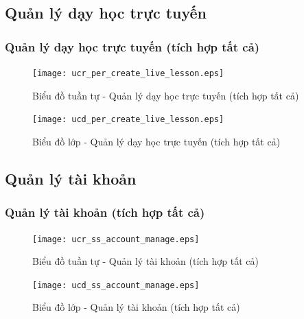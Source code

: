 \documentclass[./../main.tex]{subfiles}
\begin{document}
\subsection{Quản lý dạy học trực tuyến}
\subsubsection{Quản lý dạy học trực tuyến (tích hợp tất cả)}
\begin{figure}[H]
    \centering
    \texttt{[image: ucr\_per\_create\_live\_lesson.eps]}
    \caption{Biểu đồ tuần tự - Quản lý dạy học trực tuyến (tích hợp tất cả)}
\end{figure}
\begin{figure}[H]
    \centering
    \texttt{[image: ucd\_per\_create\_live\_lesson.eps]}
    \caption{Biểu đồ lớp - Quản lý dạy học trực tuyến (tích hợp tất cả)}
\end{figure}

\subsection{Quản lý tài khoản}
\subsubsection{Quản lý tài khoản (tích hợp tất cả)}
\begin{figure}[H]
    \centering
    \texttt{[image: ucr\_ss\_account\_manage.eps]}
    \caption{Biểu đồ tuần tự - Quản lý tài khoản (tích hợp tất cả)}
\end{figure}
\begin{figure}[H]
    \centering
    \texttt{[image: ucd\_ss\_account\_manage.eps]}
    \caption{Biểu đồ lớp - Quản lý tài khoản (tích hợp tất cả)}
\end{figure}
\end{document}
